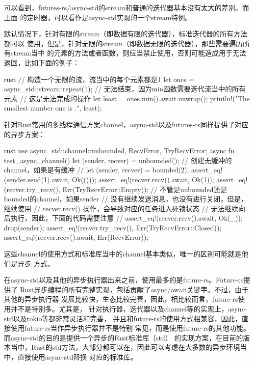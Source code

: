 可以看到，futures-rs/async-std的stream和普通的迭代器基本没有太大的差别。而上面
的定时器，可以看作是async-std实现的一个stream特例。
\begin{critical}
默认情况下，针对有限的stream（即数据有限的迭代器），标准迭代器的所有方法都可以
使用，但是，针对无限的stream（即数据无限的迭代器），那些需要遍历所有stream当中
的元素的方法或者函数，则应当禁止使用，否则可能造成用于无法返回，比如下面的例子：
\begin{code-block}{rust}
// 构造一个无限的流，流当中的每个元素都是1
let ones = async_std::stream::repeat(1);
// 无法结束，因为min函数需要迭代流当中的所有元素
// 这是无法完成的操作
let least = ones.min().await.unwrap();
println!("The smallest number one is {}.", least);
\end{code-block}
\end{critical}

针对Rust常用的多线程通信方案channel，async-std以及futures-rs同样提供了对应的异步方案：
\begin{code-block}{rust}
use async_std::channel::{unbounded, RecvError, TryRecvError};
async fn test_async_channel() {
    let (sender, recver) = unbounded(); // 创建无缓冲的channel，如果是有缓冲
                                        // let (sender, recver) = bounded(2);
    assert_eq!(sender.send(1).await, Ok(()));
    assert_eq!(recver.recv().await, Ok(1));
    assert_eq!(recver.try_recv(), Err(TryRecvError::Empty));
    // 不管是unbounded还是bounded的channel，如果sender
    // 没有继续发送消息，也没有进行关闭，但是，继续使用
    // recver.recv() 操作，会导致对应的任务进入死锁状态
    // 无法继续向后执行，因此，下面的代码需要注意
    // assert_eq!(recver.recv().await, Ok(_));
    drop(sender);
    assert_eq!(recver.try_recv(), Err(TryRecvError::Closed));
    assert_eq!(recver.recv().await, Err(RecvError));
}
\end{code-block}
这些channel的使用方式和标准库当中的channel基本类似，唯一的区别可能就是他们是异步
方式。

\begin{note}
在async-std以及其他的异步执行器出来之前，使用最多的是future-rs。Future-rs提供了
Rust异步编程的所有完整实现，包括贡献了async/await关键字。不过，由于其他的异步执行器
发展比较快，生态比较完善，因此，相比较而言，future-rs使用并不是特别多。尤其是，
针对执行器，迭代器以及channel等的实现上，async-std以及tokio等都非常灵活和完善，
并且和future-rs的使用方式相兼容，因此，直接使用future-rs当作异步执行器并不是特别
常见，而是使用future-rs的其他功能。而async-std的目的是提供一个异步的Rust标准库（std）
的实现方案，在目前的版本当中，Rust的std方法，大部分都可以在，因此可以考虑在大多数的异步环境当中，直接使用async-std替换
对应的标准库。
\end{note}

